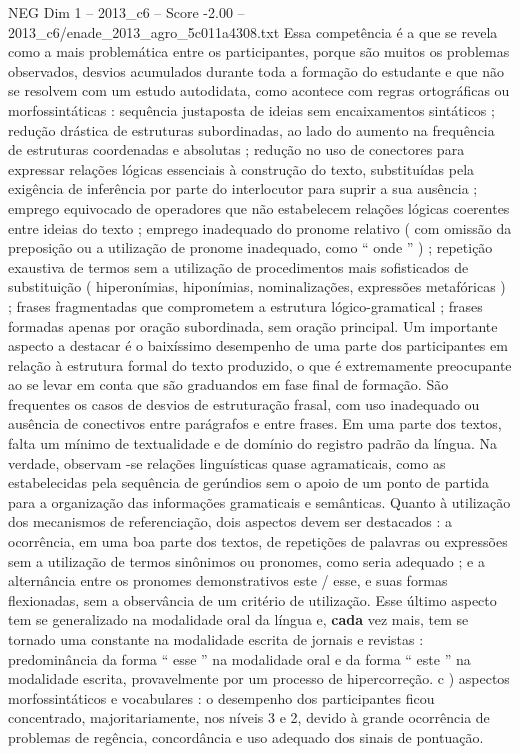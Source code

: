 \begin{textsample}{NEG Dim 1 – 2013\_c6 – Score -2.00 – 2013\_c6/enade\_2013\_agro\_5c011a4308.txt}
Essa competência é a que se revela como a mais problemática entre os participantes, porque são muitos os problemas observados, desvios acumulados durante toda a formação do estudante e que não se resolvem com um estudo autodidata, como acontece com regras ortográficas ou morfossintáticas : sequência justaposta de ideias sem encaixamentos sintáticos ; redução drástica de estruturas subordinadas, ao lado do aumento na frequência de estruturas coordenadas e absolutas ; redução no uso de conectores para expressar relações lógicas essenciais à construção do texto, substituídas pela exigência de inferência por parte do interlocutor para suprir a sua ausência ; emprego equivocado de operadores que não estabelecem relações lógicas coerentes entre ideias do texto ; emprego inadequado do pronome relativo ( com omissão da preposição ou a utilização de pronome inadequado, como “ onde ” ) ; repetição exaustiva de termos sem a utilização de procedimentos mais sofisticados de substituição ( hiperonímias, hiponímias, nominalizações, expressões metafóricas ) ; frases fragmentadas que comprometem a estrutura lógico-gramatical ; frases formadas apenas por oração subordinada, sem oração principal.
Um importante aspecto a destacar é o baixíssimo desempenho de uma parte dos participantes em relação à estrutura formal do texto produzido, o que é extremamente preocupante ao se levar em conta que são graduandos em fase final de formação.
São frequentes os casos de desvios de estruturação frasal, com uso inadequado ou ausência de conectivos entre parágrafos e entre frases.
Em uma parte dos textos, falta um mínimo de textualidade e de domínio do registro padrão da língua.
Na verdade, observam -se relações linguísticas quase agramaticais, como as estabelecidas pela sequência de gerúndios sem o apoio de um ponto de partida para a organização das informações gramaticais e semânticas.
Quanto à utilização dos mecanismos de referenciação, dois aspectos devem ser destacados : a ocorrência, em uma boa parte dos textos, de repetições de palavras ou expressões sem a utilização de termos sinônimos ou pronomes, como seria adequado ; e a alternância entre os pronomes demonstrativos este / esse, e suas formas flexionadas, sem a observância de um critério de utilização.
Esse último aspecto tem se generalizado na modalidade oral da língua e, \textbf{cada} vez mais, tem se tornado uma constante na modalidade escrita de jornais e revistas : predominância da forma “ esse ” na modalidade oral e da forma “ este ” na modalidade escrita, provavelmente por um processo de hipercorreção. c ) aspectos morfossintáticos e vocabulares : o desempenho dos participantes ficou concentrado, majoritariamente, nos níveis 3 e 2, devido à grande ocorrência de problemas de regência, concordância e uso adequado dos sinais de pontuação.

\end{textsample}
